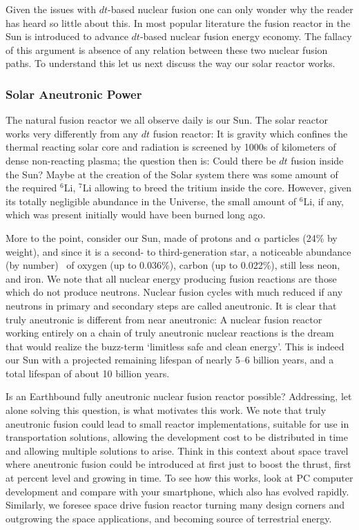 \documentclass[particles,article,accept,pdftex,moreauthors]{Definitions/mdpi}
\begin{document}
Given the issues with $dt$-based nuclear fusion one can only wonder why the reader has heard so little about this. In most popular literature the fusion reactor in the Sun is introduced to advance $dt$-based nuclear fusion energy economy. The fallacy of this argument is absence of any relation between these two nuclear fusion paths. To understand this let us next discuss the way our solar reactor works.

 \subsubsection{Solar Aneutronic Power}\label{sssub:sunN}
The natural fusion reactor we all observe daily is our Sun. The solar reactor works very differently from any $dt$ fusion reactor: It is gravity which confines the thermal reacting solar core and radiation is screened by 1000s of kilometers of dense non-reacting plasma; the question then is: Could there be $dt$ fusion inside the Sun? Maybe at the creation of the Solar system there was some amount of the required ${}^6\mathrm{Li}$, ${}^7\mathrm{Li}$ allowing to breed the tritium inside the core. However, given its totally negligible abundance in the Universe, the small amount of ${}^6\mathrm{Li}$, if any, which was present initially would have been burned long ago. %

More to the point, consider our Sun, made of protons and $\alpha$ particles (24\% by weight), and since it is a second- to third-generation star,  a noticeable abundance (by number)~\cite{Asplund:2021Sun} of oxygen (up to 0.036\%), carbon (up to 0.022\%), still less neon, and iron.  We note that all nuclear energy producing fusion reactions are those which do not produce neutrons. Nuclear fusion cycles with much reduced if any neutrons in primary and secondary steps are called aneutronic. It is clear that truly aneutronic is different from near aneutronic: A nuclear fusion reactor working entirely on a chain of truly aneutronic nuclear reactions is the dream that would realize the buzz-term `limitless safe and clean energy'. This is indeed our Sun with a projected remaining lifespan of nearly 5--6 billion years, and a total lifespan of about 10 billion years.

Is an Earthbound fully aneutronic nuclear fusion reactor possible? Addressing, let alone solving this question, is what motivates this work. We note that truly aneutronic fusion could lead to small reactor implementations, suitable for use in transportation solutions, allowing the development cost to be distributed in time and allowing multiple solutions to arise. Think in this context about space travel where aneutronic fusion could be introduced at first just to boost the thrust, first at percent level and growing in time. To see how this works, look at PC computer development and compare with your smartphone, which also has evolved rapidly. Similarly, we foresee space drive fusion reactor turning many design corners and outgrowing the space applications, and becoming source of terrestrial energy.
\end{document}
